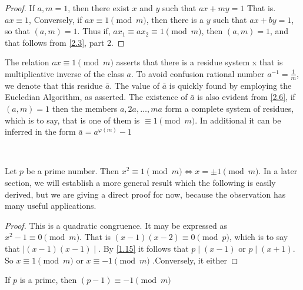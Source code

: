 \documentclass[11pt]{article}
\begin{document}
\begin{proof}
	If \(a, m = 1\), then there exist \(x\) and \(y\) such that \(ax + my = 1\) That is. \(ax \equiv 1\), Conversely, if \(ax \equiv 1 \pmod{m}\), then there is a \(y\) such that \(ax + by = 1\), so that \((a, m) = 1\). Thus if, \(ax_1 \equiv ax_2 \equiv 1 \pmod{m}\), then \((a, m) = 1\), and that follows from \cref{2.3}, part 2.
\end{proof}
\begin{note}

	The relation \(ax \equiv 1 \pmod{m}\) asserts that there is a residue system x
	that is multiplicative inverse of the class \(a\). To avoid confusion rational
	number \(a^{-1} = \frac{1}{m}\), we denote that this residue \(\bar{a}\). The
	value of \(\bar{a}\) is quickly found by employing the Eucledian Algorithm, as
	asserted. The existence of \(\bar{a}\) is also evident from \cref{2.6}, if
	\((a, m) = 1\) then the members \(a, 2a, \ldots, ma\) form a complete system of
	residues, which is to say, that is one of them is \(\equiv 1 \pmod{m}\). In
	additional it can be inferred in the form \(\bar{a} = a^{\varphi(m)} - 1\)
\end{note}\

\begin{lemma}\label{2.10}
	Let \(p\) be a prime number. Then \(x^2 \equiv 1 \pmod{m} \Longleftrightarrow x = \pm 1 \pmod{m}\). In a later section, we will establish a more general result which the following is easily derived, but we are giving a direct proof for now, because the observation has many useful applications.
\end{lemma}
\begin{proof}
	This is a quadratic congruence. It may be expressed as \(x^2  - 1\equiv 0 \pmod{m}\). That is \((x - 1)(x - 2) \equiv 0 \pmod{p}\), which is to say that \(\mid (x - 1)(x - 1)\mid\). By \cref{1.15} it follows that \(p \mid (x - 1)\) or \(p \mid (x + 1)\). So \(x \equiv 1 \pmod{m}\) or \(x \equiv -1 \pmod{m}\) .Conversely, it either
\end{proof}

\begin{theorem}\label{2.11}
	If \(p\) is a prime, then \((p  - 1) \equiv -1 \pmod{m}\)
\end{theorem}
\end{document}
